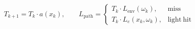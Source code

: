 \documentclass[border=6pt]{standalone}
\begin{document}
\color{black}
\(\displaystyle
T_{k+1} = T_k \cdot a(x_k),
\qquad
L_{\mathrm{path}} =
\begin{cases}
T_k \cdot L_{\mathrm{env}}(\omega_k), & \mathrm{miss}\\
T_k \cdot L_e(x_k,\omega_k), & \mathrm{light\ hit}
\end{cases}
\)
\end{document}
